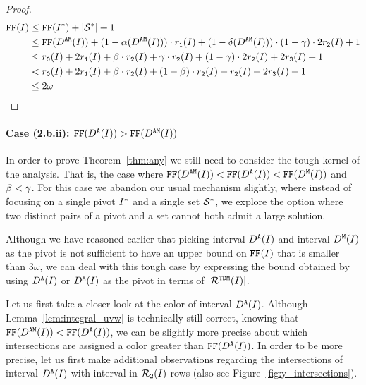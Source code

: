 {\begin{proof}
    \begin{align*}
        \text{\texttt{FF}}(I) &\leq \text{\texttt{FF}}(I^*) + |\mathcal{S}^*| + 1\\
        &\leq \text{\texttt{FF}}(D^\texttt{AM}(I)) + (1 - \alpha(D^\texttt{AM}(I))) \cdot r_\texttt{1}(I) + ( 1 -  \delta(D^\texttt{AM}(I)) ) \cdot (1 - \gamma ) \cdot 2r_\texttt{2}(I) + 1\\
        &\leq r_\texttt{0}(I) + 2r_\texttt{1}(I)  + \beta  \cdot r_\texttt{2}(I) + \gamma  \cdot r_\texttt{2}(I) + (1 - \gamma ) \cdot 2r_\texttt{2}(I) + 2r_\texttt{3}(I) + 1\\
        &< r_\texttt{0}(I) + 2r_\texttt{1}(I)  + \beta  \cdot r_\texttt{2}(I) + (1 - \beta ) \cdot r_\texttt{2}(I) + r_\texttt{2}(I) + 2r_\texttt{3}(I) + 1\\
        &\leq 2\omega
    \end{align*}
\end{proof}

\paragraph*{Case (2.b.ii): $\text{\texttt{FF}}(D^\texttt{A}(I)) > \text{\texttt{FF}}(D^\texttt{AM}(I))$ }

In order to prove Theorem~\ref{thm:any} we still need to consider the tough kernel of the analysis.
That is, the case where $\text{\texttt{FF}}(D^\texttt{AM}(I)) < \text{\texttt{FF}}(D^\texttt{A}(I)) < \text{\texttt{FF}}(D^\texttt{M}(I))$ and $\beta  < \gamma $.
For this case we abandon our usual mechanism slightly, where instead of focusing on a single pivot $I^*$ and a single set $\mathcal{S}^*$, we explore the option where two distinct pairs of a pivot and a set cannot both admit a large solution.

\medskip

Although we have reasoned earlier that picking interval $D^\texttt{A}(I)$ and interval $D^\texttt{M}(I)$ as the pivot is not sufficient to have an upper bound on $\text{\texttt{FF}}(I)$ that is smaller than $3\omega$, we can deal with this tough case by expressing the bound obtained by using $D^\texttt{A}(I)$ or $D^\texttt{M}(I)$ as the pivot in terms of $|\mathcal{R}^{\texttt{TDM}}(I)|$.

\medskip


Let us first take a closer look at the color of interval $D^\texttt{A}(I)$.
Although Lemma~\ref{lem:integral_uvw} is technically still correct, knowing that $\text{\texttt{FF}}(D^\texttt{AM}(I)) < \text{\texttt{FF}}(D^\texttt{A}(I))$, we can be slightly more precise about which intersections are assigned a color greater than $\text{\texttt{FF}}(D^\texttt{A}(I))$.
In order to be more precise, let us first make additional observations regarding the intersections of interval $D^\texttt{A}(I)$ with interval in $\mathcal{R}_\texttt{2}(I)$ rows (also see Figure~\ref{fig:y_intersections}).

}
